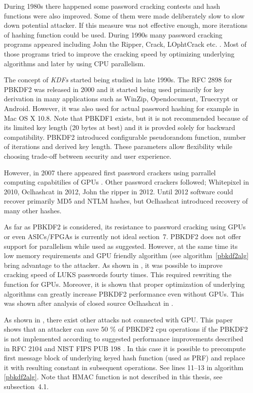 \documentclass[nolof]{fithesis3}
\begin{document}
During 1980s there happened some password cracking contests and hash functions were also improved. Some of them were made deliberately slow to slow down potential attacker. If this measure was not effective enough, more iterations of hashing function could be used. During 1990s many password cracking programs appeared including John the Ripper, Crack, LOphtCrack etc. \parencite{crackinghistory}. Most of those programs tried to improve the cracking speed by optimizing underlying algorithms and later by using CPU parallelism.

The concept of \emph{KDFs} started being studied in late 1990s. The RFC 2898 for PBKDF2 was released in 2000 and it started being used primarily for key derivation in many applications such as WinZip, Opendocument, Truecrypt or Android. However, it was also used for actual password hashing for example in Mac OS X 10.8. Note that PBKDF1 exists, but it is not recommended because of its limited key length (20 bytes at best) and it is provded solely for backward compatibility. PBKDF2 introduced configurable pseudorandom function, number of iterations and derived key length. These parameters allow flexibility while choosing trade-off between security and user experience.

However, in 2007 there appeared first password crackers using parrallel computing capabitilies of GPUs \parencite{elcomsoftgpu}. Other password crackers followed; Whitepixel in 2010, Oclhashcat in 2012, John the ripper in 2012. Until 2012 software could recover primarily MD5 and NTLM hashes, but Oclhashcat introduced recovery of many other hashes.

As far as PBKDF2 is considered, its resistance to password cracking using GPUs or even ASICs/FPGAs is currently not ideal \parencite{mosnacek}{section~7}. PBKDF2 does not offer support for parallelism while used as suggested. However, at the same time its low memory requirements and GPU friendly algorithm (see algorithm~\ref{pbkdf2alg} bring advantage to the attacker. As shown in \parencite{mosnacek}, it was possible to improve cracking speed of LUKS passwords fourty times. This required rewriting the function for GPUs. Moreover, it is shown that proper optimization of underlying algorithms can greatly increase PBKDF2 performance even without GPUs. This was shown after analysis of closed source Oclhashcat in \parencite{pbkdf2accel}.

As shown in \parencite{pbkdf2weakness}, there exist other attacks not connected with GPU. This paper shows that an attacker can save 50 \% of PBKDF2 cpu operations if the PBKDF2 is not implemented according to suggested performance improvements described in RFC 2104 \parencite{rfc2104} and NIST FIPS PUB 198 \parencite{fipspub198}. In this case it is possible to precompute first message block of underlying keyed hash function (used as PRF) and replace it with resulting constant in subsequent operations. See lines 11--13 in algorithm \ref{pbkdf2alg}. Note that HMAC function is not described in this thesis, see \parencite{pbkdf2weakness}{subsection~4.1}. 
\end{document}
